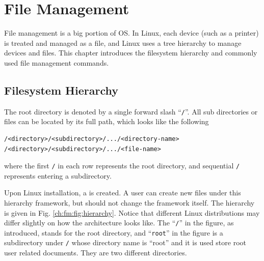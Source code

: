 \chapter{File Management} \label{ch:fm}

File management is a big portion of OS. In Linux, each device (such as a printer) is treated and managed as a file, and Linux uses a tree hierarchy to manage devices and files. This chapter introduces the filesystem hierarchy and commonly used file management commands.

\section{Filesystem Hierarchy} \label{ch:fm:sec:hierarchy}

The root directory is denoted by a single forward slash ``\verb|/|''. All sub directories or files can be located by its full path, which looks like the following
\begin{lstlisting}
/<directory>/<subdirectory>/.../<directory-name>
/<directory>/<subdirectory>/.../<file-name>
\end{lstlisting}
where the first \verb|/| in each row represents the root directory, and sequential \verb|/| represents entering a subdirectory.

Upon Linux installation, a  is created. A user can create new files under this hierarchy framework, but should not change the framework itself. The hierarchy is given in Fig. \ref{ch:fm:fig:hierarchy}. Notice that different Linux distributions may differ slightly on how the architecture looks like. The ``\verb|/|'' in the figure, as introduced, stands for the root directory, and ``\verb|root|'' in the figure is a subdirectory under \verb|/| whose directory name is ``root'' and it is used store root user related documents. They are two different directories.

